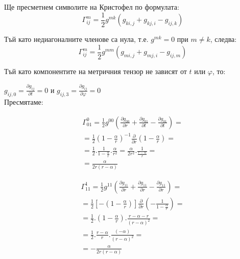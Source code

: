 \documentclass[a4paper,12pt]{article}
\begin{document}
Ще пресметнем символите на Кристофел по формулата:
\begin{equation*}
    \varGamma^m_{ij} = \frac{1}{2}g^{mk}(g_{ki,j} + g_{kj,i}-g_{ij,k})
\end{equation*}

Тъй като недиагоналните членове са нула, т.е. $g^{mk}=0$ при $m \neq k$, следва:
\begin{equation*}
    \varGamma^m_{ij} = \frac{1}{2}g^{mm}(g_{mi,j}+g_{mj,i} - g_{ij, m})
\end{equation*}

Тъй като компонентите на метричния тензор не зависят от $t$ или $\varphi$, то:

    $g_{ij, 0} = \frac{\partial g_{ij}}{\partial t} =0$ и 
    $g_{ij, 3} = \frac{\partial g_{ij}}{\partial \varphi} =0$ \\

    Пресмятаме: 

    \begin{equation}
        \begin{aligned}
        \varGamma^0_{01} = \frac{1}{2}g^{00}\left(\frac{\partial g_{00}}{\partial r} + \frac{\partial g_{01}}{\partial t} - \frac{\partial g_{01}}{\partial t}\right) =\\
        = \frac{1}{2}\left( 1- \frac{\alpha}{r}\right)^{-1} \frac{\partial}{\partial r}\left(1 - \frac{\alpha}{r}\right) =\\
        = \frac{1}{2}.\frac{1}{1 - \frac{\alpha}{r}}.\frac{\alpha}{r^2} = \frac{\alpha}{2r^2}.\frac{1}{\frac{r-\alpha}{r}} =\\ 
        = \frac{\alpha}{2r(r-\alpha)}
        \end{aligned}
    \end{equation}
    \newline

    \begin{equation}
        \begin{aligned}
        \varGamma^1_{11} = \frac{1}{2}g^{11}\left(\frac{\partial g_{11}}{\partial r} + \frac{\partial g_{11}}{\partial r} - \frac{\partial g_{11}}{\partial r}\right) =\\
        = \frac{1}{2}\left[ - \left( 1- \frac{\alpha}{r}\right)\right] \frac{\partial}{\partial r}\left(- \frac{1}{1-\frac{\alpha}{r}}\right) =\\
        = \frac{1}{2}.\left( 1- \frac{\alpha}{r}\right).\frac{r -\alpha - r}{(r-\alpha)^2} =\\ 
        = \frac{1}{2}.\frac{r-\alpha}{r}.\frac{(-\alpha)}{(r-\alpha)^2} = \\
        = -\frac{\alpha}{2r(r-\alpha)}
        \end{aligned}
    \end{equation}
    \newline
\end{document}
